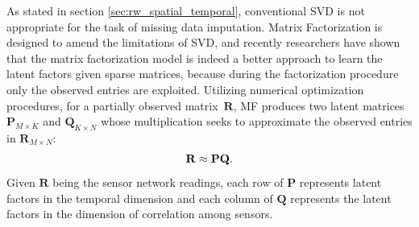 %
As stated in section \ref{sec:rw_spatial_temporal}, conventional SVD is not appropriate for the task of missing data imputation.
Matrix Factorization is designed to amend the limitations of SVD, and recently researchers have shown \cite{koren2009matrix} that the matrix factorization model is indeed a better approach to learn the latent factors given sparse matrices, because during the factorization procedure only the observed entries are exploited.
Utilizing numerical optimization procedures, for a partially observed matrix~$\mathbf{R}$, MF produces two latent 
matrices~$\mathbf{P}_{M \times K}$ and $\mathbf{Q}_{K \times N}$ whose multiplication seeks to approximate the observed entries in $\mathbf{R}_{M \times N}$:
\begin{equation*}\small \mathbf{R} \approx \mathbf{P} \mathbf{Q}.\end{equation*}
Given $\mathbf{R}$ being the sensor network readings, each row of $\mathbf{P}$ represents latent factors in the temporal dimension and each column of $\mathbf{Q}$ represents the latent factors in the dimension of correlation among sensors.

